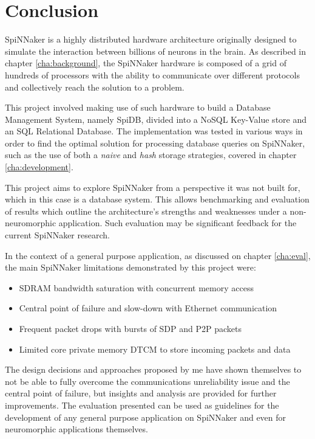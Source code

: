 \chapter{Conclusion}
\label{cha:conclusion}
SpiNNaker is a highly distributed hardware architecture originally designed to simulate the interaction between billions of neurons in the brain. As described in chapter \ref{cha:background}, the SpiNNaker hardware is composed of a grid of hundreds of processors with the ability to communicate over different protocols and collectively reach the solution to a problem.

This project involved making use of such hardware to build a Database Management System, namely SpiDB, divided into a NoSQL Key-Value store and an SQL Relational Database. The implementation was tested in various ways in order to find the optimal solution for processing database queries on SpiNNaker, such as the use of both a \textit{naive} and \textit{hash} storage strategies, covered in chapter \ref{cha:development}.

This project aims to explore SpiNNaker from a perspective it was not built for, which in this case is a database system. This allows benchmarking and evaluation of results which outline the architecture's strengths and weaknesses under a non-neuromorphic application. Such evaluation may be significant feedback for the current SpiNNaker research.

In the context of a general purpose application, as discussed on chapter \ref{cha:eval}, the main SpiNNaker limitations demonstrated by this project were:
\begin{itemize}
\setlength\itemsep{-0.1em}
	\item SDRAM bandwidth saturation with concurrent memory access
	\item Central point of failure and slow-down with Ethernet communication
	\item Frequent packet drops with bursts of SDP and P2P packets
	\item Limited core private memory DTCM to store incoming packets and data
\end{itemize}

The design decisions and approaches proposed by me have shown themselves to not be able to fully overcome the communications unreliability issue and the central point of failure, but insights and analysis are provided for further improvements. The evaluation presented can be used as guidelines for the development of any general purpose application on SpiNNaker and even for neuromorphic applications themselves.

